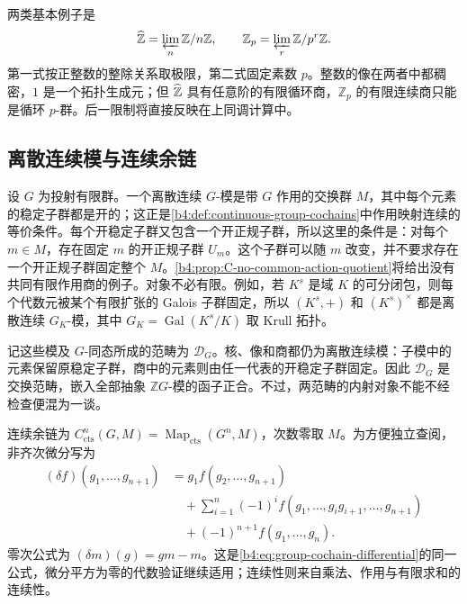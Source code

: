 两类基本例子是
\[
	\widehat{\vphantom{Z}\mathbb Z}=\varprojlim_n\mathbb Z/n\mathbb Z, \qquad \mathbb Z_p=\varprojlim_r\mathbb Z/p^r\mathbb Z.
\]
第一式按正整数的整除关系取极限，第二式固定素数 \(p\)。整数的像在两者中都稠密，\(1\) 是一个拓扑生成元；但 \(\widehat{\vphantom{Z}\mathbb Z}\) 具有任意阶的有限循环商，\(\mathbb Z_p\) 的有限连续商只能是循环 \(p\)-群。后一限制将直接反映在上同调计算中。

\subsection{离散连续模与连续余链}
\label{b4:subsec:C01:02}

设 \(G\) 为投射有限群。一个离散连续 \(G\)-模是带 \(G\) 作用的交换群 \(M\)，其中每个元素的稳定子群都是开的；这正是\cref{b4:def:continuous-group-cochains}中作用映射连续的等价条件。每个开稳定子群又包含一个开正规子群，所以这里的条件是：对每个 \(m\in M\)，存在固定 \(m\) 的开正规子群 \(U_m\)。这个子群可以随 \(m\) 改变，并不要求存在一个开正规子群固定整个 \(M\)。\cref{b4:prop:C-no-common-action-quotient}将给出没有共同有限作用商的例子。对象不必有限。例如，若 \(K^s\) 是域 \(K\) 的可分闭包，则每个代数元被某个有限扩张的 Galois 子群固定，所以 \((K^s,+)\) 和 \((K^s)^\times\) 都是离散连续 \(G_K\)-模，其中 \(G_K=\operatorname{Gal}(K^s/K)\) 取 Krull 拓扑。

\ProseParagraphBreak
记这些模及 \(G\)-同态所成的范畴为 \(\mathcal D_G\)。核、像和商都仍为离散连续模：子模中的元素保留原稳定子群，商中的元素则由任一代表的开稳定子群固定。因此 \(\mathcal D_G\) 是交换范畴，嵌入全部抽象 \(\mathbb ZG\)-模的函子正合。不过，两范畴的内射对象不能不经检查便混为一谈。

\ProseParagraphBreak
连续余链为 \(C^n_{\mathrm{cts}}(G,M)=\operatorname{Map}_{\mathrm{cts}}(G^n,M)\)，次数零取 \(M\)。为方便独立查阅，非齐次微分写为
\begin{align*}
	(\delta f)(g_1,\ldots,g_{n+1}) &=g_1f(g_2,\ldots,g_{n+1})\\
	&\quad+\sum_{i=1}^n(-1)^i f(g_1,\ldots,g_ig_{i+1},\ldots,g_{n+1})\\
	&\quad+(-1)^{n+1}f(g_1,\ldots,g_n).
\end{align*}
零次公式为 \((\delta m)(g)=gm-m\)。这是\eqref{b4:eq:group-cochain-differential}的同一公式，微分平方为零的代数验证继续适用；连续性则来自乘法、作用与有限求和的连续性。

